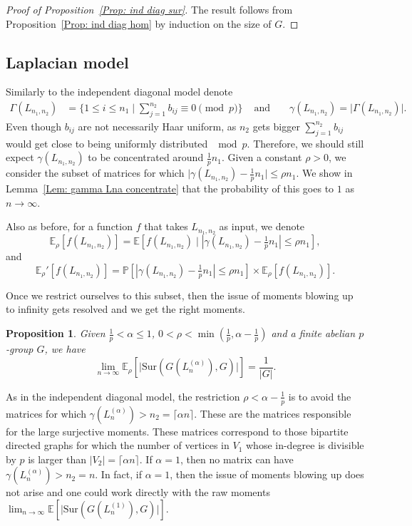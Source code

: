 \documentclass[12pt]{amsart}
\newtheorem{proposition}[theorem]{Proposition}
\theoremstyle{definition}
\newcommand{\PPP}{\mathbb{P}}
\newcommand{\Lnot}{L_{n_1,n_2}}
\newcommand{\Lna}{L_{n}^{(\alpha)}}
\newcommand{\Erho}{\E_{\rho}}
\newcommand{\Erhop}{\E_{\rho}'}
\newcommand{\abs}[1]{\vert#1\vert}
\newcommand{\E}{\mathbb{E}}
\newcommand{\Sur}{\text{Sur}}
\newcommand{\ceil}[1]{\lceil#1\rceil}
\begin{document}
\begin{proof}[Proof of Proposition~\ref{Prop: ind diag sur}]
The result follows from Proposition~\ref{Prop: ind diag hom} by induction on the size of $G$.
\end{proof}



\subsection{Laplacian model}

Similarly to the independent diagonal model denote
\begin{align*}
\Gamma(\Lnot)&=\Big\{1\leq i\leq n_1\mid \sum_{j=1}^{n_2}b_{ij}\equiv 0\pmod{p}\Big\}
&\text{ and }&
&\gamma(\Lnot)=\abs{\Gamma(\Lnot)} .
\end{align*}
Even though $b_{ij}$ are not necessarily Haar uniform, as $n_2$ gets bigger $\sum_{j=1}^{n_2}b_{ij}$ would get close to being uniformly distributed $\mod p$. Therefore, we should still expect $\gamma(\Lnot)$ to be concentrated around $\frac{1}{p} n_1$. Given a constant $\rho>0$, we consider the subset of matrices for which $\abs{\gamma(\Lnot) -\frac{1}{p}n_1}\leq\rho n_1$. We show in Lemma~\ref{Lem: gamma Lna concentrate} that the probability of this goes to $1$ as $n\to\infty$.

Also as before, for a function $f$ that takes $\Lnot$ as input, we denote
\[
\Erho[f(\Lnot)]
=\E[f(\Lnot) \mid |\gamma(\Lnot)-\tfrac{1}{p} n_1|\leq \rho n_1],
\]
and
\[
\Erhop[f(\Lnot)]
=\PPP[|\gamma(\Lnot)-\tfrac{1}{p} n_1|\leq \rho n_1] \times \E_{\rho}[f(\Lnot)].
\]

Once we restrict ourselves to this subset, then the issue of moments blowing up to infinity gets resolved and we get the right moments.

\begin{proposition}\label{Prop: Sur moment Laplacian}
Given $\frac{1}{p}<\alpha\leq 1$, $0<\rho<\min(\frac{1}{p},\alpha-\frac{1}{p})$  and a finite abelian $p$-group $G$, we have
\[
\lim_{n\to\infty} 
\Erho[\abs{\Sur(G(\Lna),G)}] =\frac{1}{|G|}.
\]
\end{proposition}

As in the independent diagonal model, the restriction $\rho<\alpha-\frac{1}{p}$ is to avoid the matrices for which $\gamma(\Lna)> n_2=\ceil{\alpha n}$. These are the matrices responsible for the large surjective moments.
These matrices correspond to those bipartite directed graphs for which the number of vertices in $V_1$ whose in-degree is divisible by $p$ is larger than $\abs{V_2}=\ceil{\alpha n}$.
If $\alpha=1$, then no matrix can have $\gamma(\Lna)> n_2=n$. In fact, if $\alpha=1$, then the issue of moments blowing up does not arise and one could work directly with the raw moments $\lim_{n\to\infty} \E[\big|\Sur(G(L_n^{(1)}),G)\big|]$.
\end{document}
